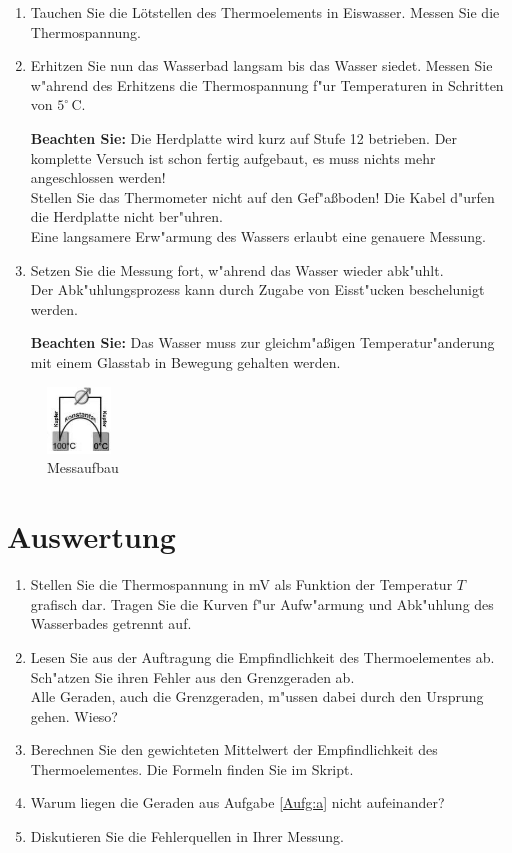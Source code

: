 \begin{enumerate}
 \item Tauchen Sie die Lötstellen des Thermoelements in Eiswasser. Messen Sie die Thermospannung.
 \item Erhitzen Sie nun das Wasserbad langsam bis das Wasser siedet. Messen Sie w"ahrend des Erhitzens die Thermospannung f"ur Temperaturen in Schritten von $5^{\circ}$\,C.
 
 \noindent
 \textbf{Beachten Sie:} Die Herdplatte wird kurz auf Stufe 12 betrieben. Der komplette Versuch ist schon fertig aufgebaut, es muss nichts mehr angeschlossen werden!\\
 Stellen Sie das Thermometer nicht auf den Gef"a{\ss}boden! Die Kabel d"urfen die Herdplatte nicht ber"uhren.\\
 Eine langsamere Erw"armung des Wassers erlaubt eine genauere Messung.
 \item Setzen Sie die Messung fort, w"ahrend das Wasser wieder abk"uhlt. \\
 Der Abk"uhlungsprozess kann durch Zugabe von Eisst"ucken beschelunigt werden.
 
 \noindent
 \textbf{Beachten Sie:} Das Wasser muss zur gleichm"a{\ss}igen Temperatur"anderung mit einem Glasstab in Bewegung gehalten werden.
\end{enumerate}
\begin{figure}[h!]
	\centering
		\includegraphics[width=0.15\textwidth]{Versuch_11-12/Abbildungen/Messung.JPG}
	\caption{Messaufbau}
	\label{fig:Messung}
\end{figure}
\section{Auswertung} 

\begin{enumerate}
 \item Stellen Sie die Thermospannung in mV als Funktion der Temperatur $T$ grafisch dar. Tragen Sie die Kurven f"ur Aufw"armung und Abk"uhlung des Wasserbades getrennt auf. \label{Aufg:a}
 \item Lesen Sie aus der Auftragung die Empfindlichkeit des Thermoelementes ab. Sch"atzen Sie ihren Fehler aus den Grenzgeraden ab.\\
 Alle Geraden, auch die Grenzgeraden, m"ussen dabei durch den Ursprung gehen. Wieso?
 \item Berechnen Sie den gewichteten Mittelwert der Empfindlichkeit des Thermoelementes. Die Formeln finden Sie im Skript.
 \item Warum liegen die Geraden aus Aufgabe \ref{Aufg:a} nicht aufeinander?
 \item Diskutieren Sie die Fehlerquellen in Ihrer Messung.
\end{enumerate}